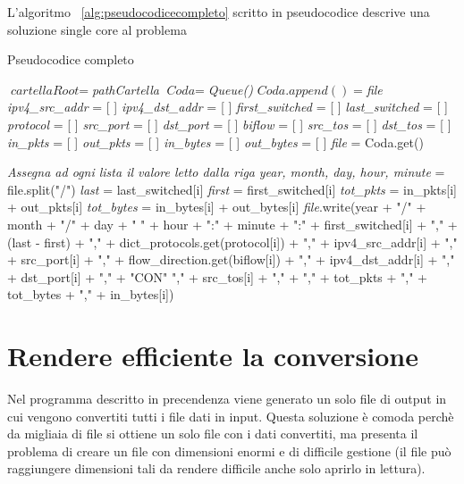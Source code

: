 \documentclass[../main.tex]{subfiles}
\begin{document}
L'algoritmo ~\ref{alg:pseudocodicecompleto} scritto in pseudocodice descrive una soluzione single core al problema

\begin{algorithm}[H]
\begin{algorithmic}[1]
				\caption{Pseudocodice completo}
				\label{alg:pseudocodicecompleto}
				\State $\textit{cartellaRoot} =  $\textit{pathCartella}
				\State $\textit{Coda} = $\textit{Queue()}
						\State $\textit{Coda}.append() = $\textit{file}
						\EndFor
				\EndFor
				\State \textit{ipv4\_src\_addr} = [ ]
				\State \textit{ipv4\_dst\_addr} = [ ]
				\State \textit{first\_switched} = [ ]
				\State \textit{last\_switched} = [ ]
				\State \textit{protocol} = [ ]
				\State \textit{src\_port} = [ ]
				\State \textit{dst\_port} = [ ]
				\State \textit{biflow} = [ ]
				\State \textit{src\_tos} = [ ]
				\State \textit{dst\_tos} = [ ]
				\State \textit{in\_pkts} = [ ]
				\State \textit{out\_pkts} = [ ]
				\State \textit{in\_bytes} = [ ]
				\State \textit{out\_bytes} = [ ]
				\State \textit{file} = Coda.get()

						\State \textit{Assegna ad ogni lista il valore letto dalla riga}
				\EndFor
				\State \textit{year, month, day, hour, minute} = file.split("/") 
				\State \textit{last} = last\_switched[i]
				\State \textit{first} = first\_switched[i]
				\State \textit{tot\_pkts} = in\_pkts[i] + out\_pkts[i]
				\State \textit{tot\_bytes} = in\_bytes[i] + out\_bytes[i]
				\State \textit{file}.write(year + "/" + month + "/" + day + " " + hour + ":" + minute + ":" + first\_switched[i] + "," + (last - first) + "," + dict\_protocols.get(protocol[i]) + "," + ipv4\_src\_addr[i] + "," + src\_port[i] + "," + flow\_direction.get(biflow[i]) + "," + ipv4\_dst\_addr[i] + "," + dst\_port[i] + "," + "CON" "," + src\_tos[i] + "," + "," + tot\_pkts + "," + tot\_bytes + "," + in\_bytes[i])
				\EndWhile
				
\end{algorithmic}
\end{algorithm}

\section{Rendere efficiente la conversione}

Nel programma descritto in precendenza viene generato un solo file di output in cui vengono convertiti tutti i file dati in input. Questa soluzione è comoda perchè da migliaia di file si ottiene un solo file con i dati convertiti, ma presenta il problema di creare un file con dimensioni enormi e di difficile gestione (il file può raggiungere dimensioni tali da rendere difficile anche solo aprirlo in lettura).
\end{document}

